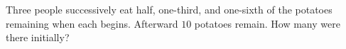 Three people successively eat half, one-third, and one-sixth of the potatoes remaining when each begins. Afterward $10$ potatoes remain. How many were there initially?
